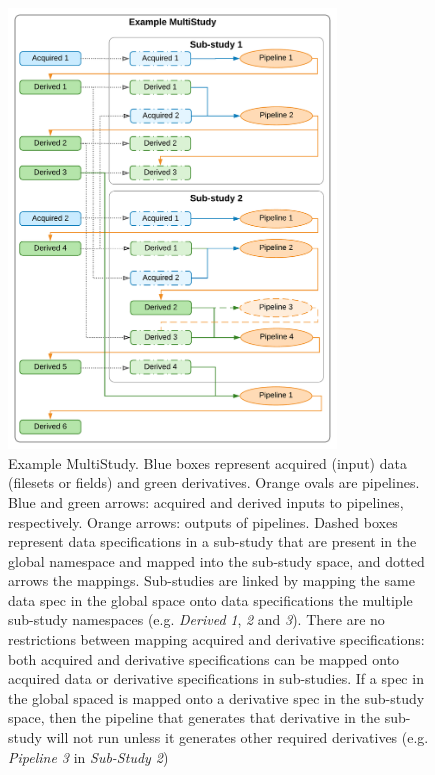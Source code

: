 \documentclass[smallextended]{svjour3}       %
\begin{document}
\begin{figure}
  \centering
    \includegraphics[width=0.775\textwidth]{figures/example_multi_study}
  \caption{Example MultiStudy. Blue boxes represent acquired
(input) data (filesets or fields) and green derivatives. Orange ovals
are pipelines. Blue and green arrows: acquired and derived inputs to
pipelines, respectively. Orange arrows: outputs of pipelines. Dashed
boxes represent data specifications in a sub-study that are present in
the global namespace and mapped into the sub-study space, and dotted
arrows the mappings. Sub-studies are linked by mapping the same data
spec in the global space onto data specifications the multiple sub-study
namespaces (e.g. \emph{Derived} \emph{1}, \emph{2} and \emph{3}).
There are no restrictions
between mapping acquired and derivative specifications: both acquired
and derivative specifications can be mapped onto acquired data or
derivative specifications in sub-studies. If a spec in the global spaced
is mapped onto a derivative spec in the sub-study space, then the
pipeline that generates that derivative in the sub-study will not run
unless it generates other required derivatives (e.g. \emph{Pipeline 3} in
\emph{Sub-Study 2})}
\label{fig:example_multi_study}
\end{figure}
\end{document}
